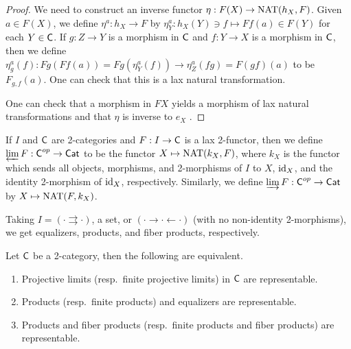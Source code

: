  \begin{proof}
   We need to construct an inverse functor $\eta:F(X)\to \operatorname{NAT}(h_X,F)$. Given $a\in F(X)$,
   we define $\eta^a:h_X\to F$ by $\eta^a_Y:h_X(Y)\ni f\mapsto Ff(a)\in F(Y)$ for each
   $Y\in \text{\sf C}$. If $g:Z\to Y$ is a morphism in $\text{\sf C}$ and $f:Y\to X$ is a morphism in $\text{\sf C}$,
   then we define $\eta^a_g(f):Fg(Ff(a))=Fg(\eta^a_Y(f))\to \eta^a_Z(fg)=F(gf)(a)$ to be
   $F_{g,f}(a)$. One can check that this is a lax natural transformation.

   One can check that a morphism in $FX$ yields a morphism of lax natural transformations
   and that $\eta$ is inverse to $e_X$ .
 \end{proof}

 \begin{definition}[Limits]\label{ApdxD:limits_in_2-categories}
   If $I$ and $\text{\sf C}$ are 2-categories and $F:I\to \text{\sf C}$ is a lax 2-functor, then we define
   $\varprojlim F:\text{\sf C}^{op}\to \text{\sf Cat}$ to be the functor $X\mapsto \operatorname{NAT}(k_X,F)$, where $k_X$ is
   the functor which sends all objects, morphisms, and 2-morphisms of $I$ to $X$, $\operatorname{id}_X$,
   and the identity 2-morphism of $\operatorname{id}_X$, respectively. Similarly, we define $\varinjlim
   F:\text{\sf C}^{op}\to \text{\sf Cat}$ by $X\mapsto \operatorname{NAT}(F,k_X)$.
 \end{definition}
 \begin{example}
   Taking $I=(\cdot\rightrightarrows \cdot)$, a set, or $(\cdot\to\cdot\leftarrow\cdot)$
   (with no non-identity 2-morphisms), we get equalizers, products, and fiber products,
   respectively.
 \end{example}
 \begin{lemma}
   Let $\text{\sf C}$ be a 2-category, then the following are equivalent.
   \begin{enumerate}
     \item Projective limits (resp.~finite projective limits) in $\text{\sf C}$ are representable.
     \item Products (resp.~finite products) and equalizers are representable.
     \item Products and fiber products (resp.~finite products and fiber products) are representable.
   \end{enumerate}
 \end{lemma}


